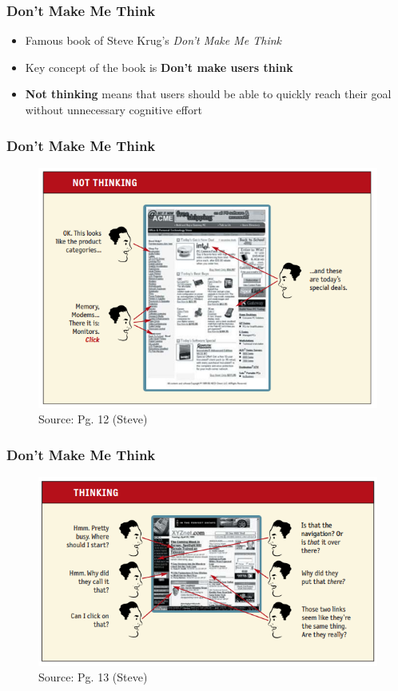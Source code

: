 \documentclass{beamer}
\begin{document}
\begin{frame}
	\frametitle{Don't Make Me Think}
	\begin{itemize}
		\item Famous book of Steve Krug's \textit{Don't Make Me Think}
		\item Key concept of the book is \textbf{Don't make users think}
		\item \textbf{Not thinking} means that users should be able to quickly reach their goal without unnecessary cognitive effort
	\end{itemize}
\end{frame}

\begin{frame}
	\frametitle{Don't Make Me Think}
	\centering
	\begin{figure}
		\includegraphics[width=0.7\linewidth]{steve/not-thinking}
		\caption{Source: Pg. 12 (Steve)}
	\end{figure}
\end{frame}

\begin{frame}
	\frametitle{Don't Make Me Think}
	\centering
	\begin{figure}
		\includegraphics[width=0.8\linewidth]{steve/thinking}
		\caption{Source: Pg. 13 (Steve)}
	\end{figure}
\end{frame}
\end{document}
